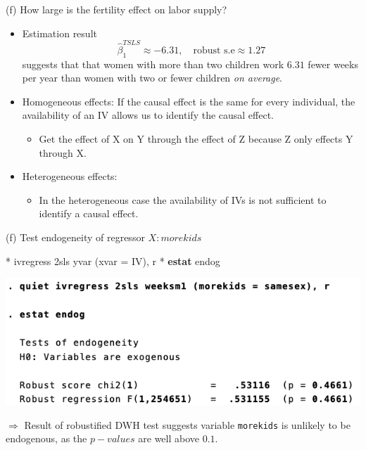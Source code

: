 \documentclass[
  10pt,
  ignorenonframetext,
]{beamer}
\newenvironment{Shaded}{\begin{snugshade}}{\end{snugshade}}
\newcommand{\FunctionTok}[1]{\textcolor[rgb]{0.00,0.00,0.00}{#1}}
\newcommand{\KeywordTok}[1]{\textcolor[rgb]{0.13,0.29,0.53}{\textbf{#1}}}
\newcommand{\NormalTok}[1]{#1}
\providecommand{\tightlist}{%
  \setlength{\itemsep}{0pt}\setlength{\parskip}{0pt}}
\begin{document}
\begin{frame}{(f) How large is the fertility effect on labor supply?}
\protect\hypertarget{f-how-large-is-the-fertility-effect-on-labor-supply}{}
\begin{itemize}
\item
  Estimation result \[
  \hat{\beta}_1^{TSLS} \approx -6.31, \quad \text{robust s.e} \approx 1.27 
  \] suggests that that women with more than two children work \(6.31\)
  fewer weeks per year than women with two or fewer children \emph{on
  average}.
\item
  Homogeneous effects: If the causal effect is the same for every
  individual, the availability of an IV allows us to identify the causal
  effect.

  \begin{itemize}
  \tightlist
  \item
    Get the effect of X on Y through the effect of Z because Z only
    effects Y through X.
  \end{itemize}
\item
  Heterogeneous effects:

  \begin{itemize}
  \tightlist
  \item
    In the heterogeneous case the availability of IVs is not sufficient
    to identify a causal effect.
  \end{itemize}
\end{itemize}
\end{frame}

\begin{frame}[fragile]{(f) Test endogeneity of regressor \(X:morekids\)}
\protect\hypertarget{f-test-endogeneity-of-regressor-xmorekids}{}
\begin{Shaded}
\begin{Highlighting}[]
\NormalTok{* ivregress 2sls yvar (xvar = IV), }\FunctionTok{r}
\NormalTok{* }\KeywordTok{estat}\NormalTok{ endog}
\end{Highlighting}
\end{Shaded}

\begin{center}\includegraphics[width=0.7\linewidth]{pictures/res5-estatEndog} \end{center}

\(\Rightarrow\) Result of robustified DWH test suggests variable
\texttt{morekids} is unlikely to be endogenous, as the \(p-values\) are
well above \(0.1\).
\end{frame}
\end{document}
